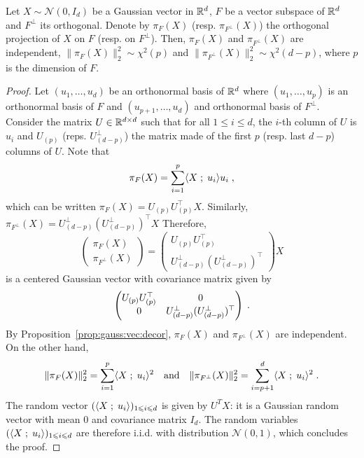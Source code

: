 \begin{shaded}
\begin{theorem}[Cochran]
\label{th:cochran}
Let $X\sim \mathcal{N}(0,I_d)$ be a Gaussian vector in $\mathbb{R}^d$, $F$ be a vector subspace of $\mathbb{R}^d$ and $F^{\perp}$ its orthogonal. Denote by $\pi_F(X)$ (resp. $\pi_{F^{\perp}}(X)$) the orthogonal projection of $X$ on $F$ (resp. on $F^{\perp}$). Then,  $\pi_F(X)$ and $\pi_{F^{\perp}}(X)$ are independent, $\|\pi_F(X)\|_2^2\sim\chi^2(p)$ and $\|\pi_{F^{\perp}}(X)\|_2^2 \sim \chi^2(d-p)$, where $p$ is the dimension of $F$.
\end{theorem}
\end{shaded}
\begin{proof}
Let $(u_1,\ldots,u_d)$ be an orthonormal basis of $\mathbb{R}^d$ where $(u_1,\ldots,u_p)$ is an orthonormal basis of $F$ and $(u_{p+1},\ldots,u_d)$ and orthonormal basis of $F^{\perp}$. Consider the matrix $U\in\mathbb{R}^{d\times d}$ such that for all $1\leqslant i\leqslant d$, the $i$-th column of $U$ is $u_i$ and $U_{(p)}$ (reps. $U_{(d-p)}^{\perp}$) the matrix made of the first $p$ (resp. last $d-p$) columns of $U$. Note that
\[
\pi_F(X) = \sum_{i=1}^p \langle X\;;\; u_i\rangle u_i\;,
\]
which can be written $\pi_F(X) = U_{(p)}U_{(p)}^\top X$. Similarly, $\pi_{F^{\perp}}(X) = U^{\perp}_{(d-p)}(U^{\perp}_{(d-p)})^\top X$
Therefore,
\[
\begin{pmatrix}\pi_F(X)\\ \pi_{F^{\perp}}(X)\end{pmatrix}  = \begin{pmatrix} U_{(p)}U_{(p)}^\top \\ U^{\perp}_{(d-p)}(U^{\perp}_{(d-p)})^\top\end{pmatrix}X
\]
is a centered Gaussian vector with covariance matrix given by
\[
 \begin{pmatrix} U_{(p)}U_{(p)}^\top &  0 \\ 0 & U^{\perp}_{(d-p)}(U^{\perp}_{(d-p)})^\top\end{pmatrix}\;.
\]
By Proposition~\ref{prop:gauss:vec:decor}, $\pi_F(X)$ and $\pi_{F^{\perp}}(X)$ are independent. On the other hand,
\[
\|\pi_F(X)\|_2^2 = \sum_{i=1}^p \langle X\;;\; u_i\rangle^2 \quad\mathrm{and} \quad \|\pi_{F^{\perp}}(X)\|_2^2 = \sum_{i=p+1}^d \langle X\;;\; u_i\rangle^2\;. 
\]
The random vector $(\langle X\;;\; u_i\rangle)_{1\leqslant i \leqslant d}$ is given by $U^TX$: it is a Gaussian random vector with mean $0$ and covariance matrix $I_d$. The random variables $(\langle X\;;\; u_i\rangle)_{1\leqslant i \leqslant d}$ are therefore i.i.d. with distribution $\mathcal{N}(0,1)$, which concludes the proof.
\end{proof}

